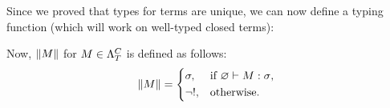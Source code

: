 \documentclass[main.tex]{subfiles}
\begin{document}
Since we proved that types for terms are unique, we can now define a typing
function (which will work on well-typed closed terms):
\begin{defn}
    Now, $\typeof{M}$ for $M \in \plambda{T}{C}$ is defined as follows:
    \[
        \typeof{M} =
        \begin{cases*}
            \sigma, & if $\varnothing \vdash M : \sigma$, \\
            \neg !, & otherwise.
        \end{cases*}
    \]
\end{defn}
\end{document}
